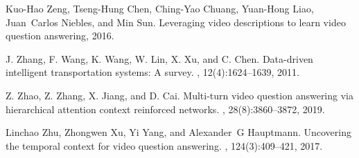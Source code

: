 \documentclass[final]{cvpr}
\begin{document}
{\begin{thebibliography}{10}
Kuo-Hao Zeng, Tseng-Hung Chen, Ching-Yao Chuang, Yuan-Hong Liao, Juan~Carlos
  Niebles, and Min Sun.
\newblock Leveraging video descriptions to learn video question answering,
  2016.

J. {Zhang}, F. {Wang}, K. {Wang}, W. {Lin}, X. {Xu}, and C. {Chen}.
\newblock Data-driven intelligent transportation systems: A survey.
,
  12(4):1624--1639, 2011.

Z. {Zhao}, Z. {Zhang}, X. {Jiang}, and D. {Cai}.
\newblock Multi-turn video question answering via hierarchical attention
  context reinforced networks.
, 28(8):3860--3872, 2019.

Linchao Zhu, Zhongwen Xu, Yi Yang, and Alexander~G Hauptmann.
\newblock Uncovering the temporal context for video question answering.
, 124(3):409--421,
  2017.

\end{thebibliography}
 
}
\end{document}
